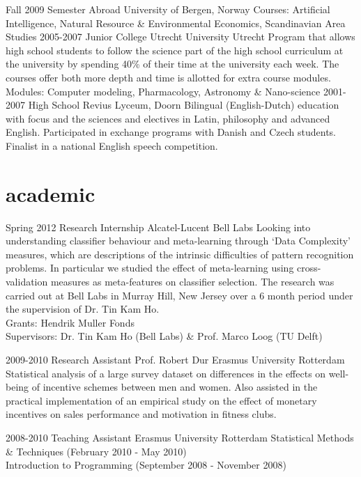 \documentclass[]{friggeri-cv}
\begin{document}
\begin{entrylist}
  
  \entry
    {Fall 2009}
    {Semester Abroad}
    {University of Bergen, Norway}
    {Courses: Artificial Intelligence,
			Natural Resource \& Environmental Economics,
			Scandinavian Area Studies
}  
  \entry
    {2005-2007}
    {Junior College Utrecht}
    {University Utrecht}
    {Program that allows high school students to follow the science part of the high school curriculum at the university by spending 40\% of their time at the university each week. The courses offer both more depth and time is allotted for extra course modules.
		Modules: Computer modeling, Pharmacology,	Astronomy \& Nano-science}
  \entry
    {2001-2007}
    {High School}
    {Revius Lyceum, Doorn}
    {Bilingual (English-Dutch) education with focus and the sciences and electives in Latin, philosophy and advanced English. Participated in exchange programs with Danish and Czech students. Finalist in a national English speech competition.}
\end{entrylist}

\newpage
\section{academic}

\begin{entrylist}
  \entry
    {Spring 2012}
    {Research Internship}
    {Alcatel-Lucent Bell Labs}
    {Looking into understanding classifier behaviour and meta-learning through ‘Data Complexity’ measures, which are descriptions of the intrinsic difficulties of pattern recognition problems. In particular we studied the effect of meta-learning using cross-validation measures as meta-features on classifier selection. The research was carried out at Bell Labs in Murray Hill, New Jersey over a 6 month period under the supervision of Dr. Tin Kam Ho.\\
	Grants: Hendrik Muller Fonds\\
	Supervisors: 	Dr. Tin Kam Ho (Bell Labs) \& Prof. Marco Loog (TU Delft)
}

\entry
{2009-2010} %
{Research Assistant Prof. Robert Dur}
{Erasmus University Rotterdam}
{Statistical analysis of a large survey dataset on differences in the effects on well-being of incentive schemes between men and women. Also assisted in the practical implementation of an empirical study on the effect of monetary incentives on sales performance and motivation in fitness clubs.}

\entry
{2008-2010}
{Teaching Assistant} 
{Erasmus University Rotterdam}
{Statistical Methods \& Techniques (February 2010 - May 2010)\\
Introduction to Programming (September 2008 - November 2008)}

\end{entrylist}
\end{document}

